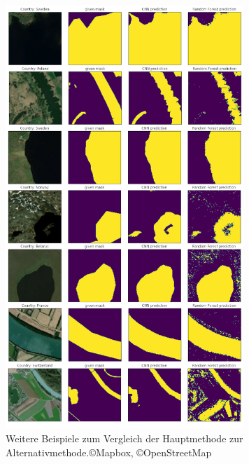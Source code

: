 \begin{figure}
    \centering
    \includegraphics[width=0.8\textwidth]{images/bsp.png}
    \caption{Weitere Beispiele zum Vergleich der Hauptmethode zur Alternativmethode.\copyright Mapbox, \copyright OpenStreetMap}
    \label{fig:bsp}
\end{figure}

